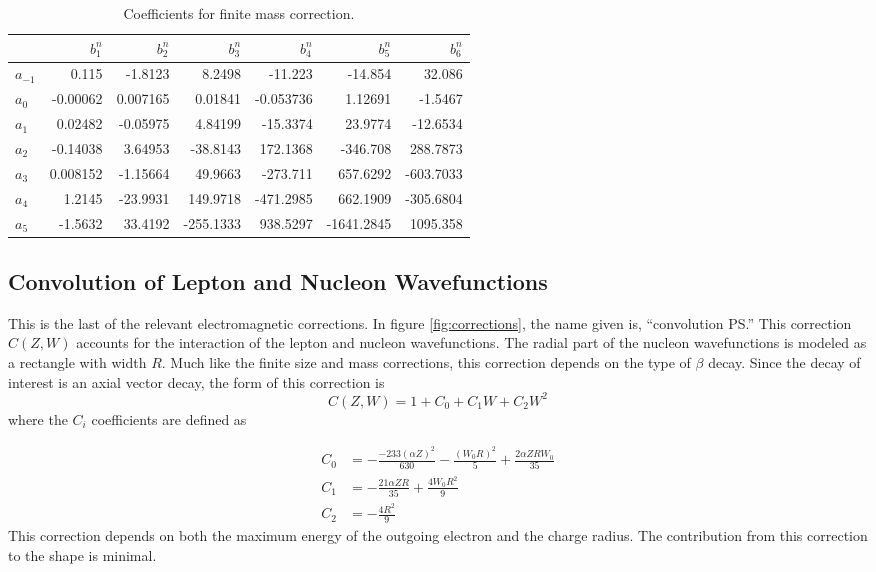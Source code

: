 \documentclass[../MaxHughesThesis.tex]{subfiles}
\begin{document}
\begin{table}[!hbt]
	\centering
	\caption{Coefficients for finite mass correction.}
		\begin{tabular}{lrrrrrr}
		         & $b^{n}_{1}$ & $b^{n}_{2}$ & $b^{n}_{3}$ & $b^{n}_{4}$ & $b^{n}_{5}$ & $b^{n}_{6}$ \\ \hline
		$a_{-1}$ & 0.115 & -1.8123 & 8.2498 & -11.223 & -14.854 & 32.086 \\
		$a_{0}$  & -0.00062 & 0.007165 & 0.01841 & -0.053736 & 1.12691 & -1.5467 \\
		$a_{1}$  & 0.02482 & -0.05975 & 4.84199 & -15.3374 & 23.9774 & -12.6534 \\
		$a_{2}$  & -0.14038 & 3.64953 & -38.8143 & 172.1368 & -346.708 & 288.7873 \\
		$a_{3}$  & 0.008152 & -1.15664 & 49.9663 & -273.711 & 657.6292 & -603.7033 \\
		$a_{4}$  & 1.2145 & -23.9931 & 149.9718 & -471.2985 & 662.1909 & -305.6804 \\
		$a_{5}$  & -1.5632 & 33.4192 & -255.1333 & 938.5297 & -1641.2845 & 1095.358 
		\end{tabular}
	\label{tab:bcoef}
\end{table}

\subsection{Convolution of Lepton and Nucleon Wavefunctions}

This is the last of the relevant electromagnetic corrections.
In figure \ref{fig:corrections}, the name given is, ``convolution PS.''
This correction $C(Z,W)$ accounts for the interaction of the lepton and nucleon wavefunctions. 
The radial part of the nucleon wavefunctions is  modeled as a rectangle with width $R$.
Much like the finite size and mass corrections, this correction depends on the type of $\beta$ decay.
Since the decay of interest is an axial vector decay, the form of this correction is %
\begin{equation}
	C(Z,W) = 1 + C_{0} + C_{1} W + C_{2} W^{2}
	\label{eq:nucandlepconv}
\end{equation}
where the $C_{i}$ coefficients are defined as \cite{WIL90} %

\begin{equation}
	\label{eq:csconvocorrection}
	\begin{split}
	C_{0} & = -\frac{-233(\alpha Z)^{2}}{630} - \frac{(W_{0} R)^{2}}{5} + \frac{2 \alpha Z R W_{0}}{35} \\
	C_{1} & = -\frac{21 \alpha Z R}{35} + \frac{4 W_{0} R^{2}}{9} \\
	C_{2} & = -\frac{4 R^{2}}{9}
	\end{split}
\end{equation}
This correction depends on both the maximum energy of the outgoing electron and the charge radius.
The contribution from this correction to the shape is minimal. 
\end{document}
